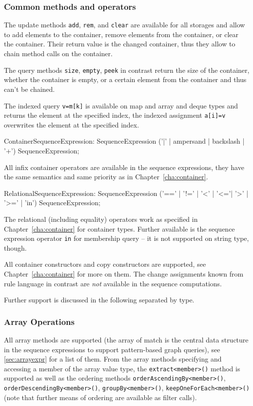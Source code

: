 \subsubsection*{Common methods and operators}

The update methods \texttt{add}, \texttt{rem}, and \texttt{clear} are available for all storages and allow to add elements to the container, remove elements from the container, or clear the container.
Their return value is the changed container, thus they allow to chain method calls on the container.

The query methods \texttt{size}, \texttt{empty}, \texttt{peek} in contrast return the size of the container, whether the container is empty, or a certain element from the container and thus can't be chained.

The indexed query \texttt{v=m[k]} is available on map and array and deque types and returns the element at the specified index,
the indexed assignment \texttt{a[i]=v} overwrites the element at the specified index.

\begin{rail}
  ContainerSequenceExpression: 
    SequenceExpression ('|' | ampersand | backslash | '+') SequenceExpression;
\end{rail}

All infix container operators are available in the sequence expressions, they have the same semantics and same priority as in Chapter~\ref{cha:container}.

\begin{rail}
  RelationalSequenceExpression: 
    SequenceExpression ('==' | '!=' | '<' | '<='| '>' | '>=' | 'in') SequenceExpression;
\end{rail}

The relational (including equality) operators work as specified in Chapter~\ref{cha:container} for container types.
Further available is the sequence expression operator \texttt{in} for membership query -- it is not supported on string type, though.

All container constructors and copy constructors are supported, see Chapter~\ref{cha:container} for more on them.
The change assignments known from rule language in contrast are \emph{not} available in the sequence computations.

Further support is discussed in the following separated by type.

\subsubsection*{Array Operations}
All array methods are supported (the array of match is the central data structure in the sequence expressions to support pattern-based graph queries), see \ref{sec:arrayexpr} for a list of them.
From the array methods specifying and accessing a member of the array value type, the \texttt{extract<member>()} method is supported as well as the ordering methods \texttt{order\-Ascending\-By<member>()}, \texttt{order\-Descending\-By<member>()}, \texttt{group\-By<member>()}, \texttt{keep\-One\-For\-Each<member>()} (note that further means of ordering are available as filter calls).

